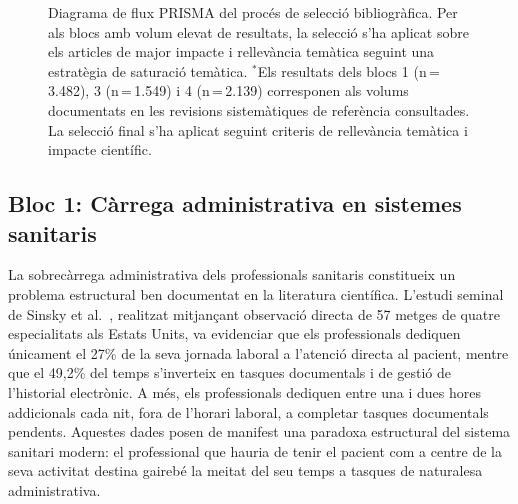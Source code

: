 \documentclass[11pt,a4paper]{article}
\begin{document}
\begin{figure}[H]
\caption{Diagrama de flux PRISMA del procés de selecció bibliogràfica. Per als blocs amb volum elevat de resultats, la selecció s'ha aplicat sobre els articles de major impacte i rellevància temàtica seguint una estratègia de saturació temàtica. $^{*}$Els resultats dels blocs 1 (n\,=\,3.482), 3 (n\,=\,1.549) i 4 (n\,=\,2.139) corresponen als volums documentats en les revisions sistemàtiques de referència consultades. La selecció final s'ha aplicat seguint criteris de rellevància temàtica i impacte científic.}
\label{fig:prisma}
\end{figure}



\subsection*{Bloc 1: Càrrega administrativa en sistemes sanitaris}

La sobrecàrrega administrativa dels professionals sanitaris constitueix un problema estructural ben documentat en la literatura científica. L'estudi seminal de Sinsky et al.~\cite{sinsky2016allocation}, realitzat mitjançant observació directa de 57 metges de quatre especialitats als Estats Units, va evidenciar que els professionals dediquen únicament el 27\% de la seva jornada laboral a l'atenció directa al pacient, mentre que el 49,2\% del temps s'inverteix en tasques documentals i de gestió de l'historial electrònic. A més, els professionals dediquen entre una i dues hores addicionals cada nit, fora de l'horari laboral, a completar tasques documentals pendents. Aquestes dades posen de manifest una paradoxa estructural del sistema sanitari modern: el professional que hauria de tenir el pacient com a centre de la seva activitat destina gairebé la meitat del seu temps a tasques de naturalesa administrativa.
\end{document}
